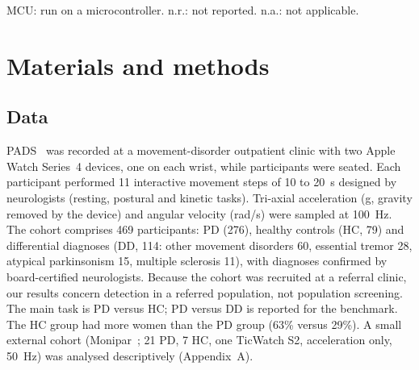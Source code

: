 \documentclass[preprint,12pt]{elsarticle}
\begin{document}
\begin{table}[!t]
\caption{Comparison with prior work.}
\label{tab:related}
\centering
{}

\vspace{2pt}\parbox{\linewidth}{\footnotesize MCU: run on a microcontroller. n.r.: not reported. n.a.: not applicable.}
\end{table}

\section{Materials and methods}
\label{sec:methods}
\subsection{Data}
PADS~\cite{Varghese2024,PADSdata} was recorded at a movement-disorder outpatient clinic with two Apple Watch Series~4 devices, one on each wrist, while participants were seated. Each participant performed 11 interactive movement steps of 10 to 20~s designed by neurologists (resting, postural and kinetic tasks). Tri-axial acceleration (g, gravity removed by the device) and angular velocity (rad/s) were sampled at 100~Hz. The cohort comprises 469 participants: PD (276), healthy controls (HC, 79) and differential diagnoses (DD, 114: other movement disorders 60, essential tremor 28, atypical parkinsonism 15, multiple sclerosis 11), with diagnoses confirmed by board-certified neurologists. Because the cohort was recruited at a referral clinic, our results concern detection in a referred population, not population screening. The main task is PD versus HC; PD versus DD is reported for the benchmark. The HC group had more women than the PD group (63\% versus 29\%). A small external cohort (Monipar~\cite{Monipar2023,MoniparData}; 21 PD, 7 HC, one TicWatch S2, acceleration only, 50~Hz) was analysed descriptively (Appendix~A).
\end{document}
